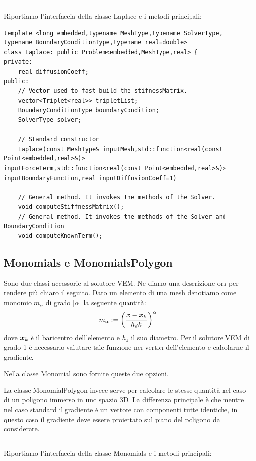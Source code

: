 \documentclass[oneside,12pt]{book}  %
\theoremstyle{plain}
\theoremstyle{definition}
\theoremstyle{remark}
\numberwithin{equation}{chapter} %
\begin{document}
\noindent\rule{14cm}{1pt}

Riportiamo l'interfaccia della classe Laplace e i metodi principali:

\begin{verbatim}
template <long embedded,typename MeshType,typename SolverType,
typename BoundaryConditionType,typename real=double>
class Laplace: public Problem<embedded,MeshType,real> {
private:
    real diffusionCoeff;	
public:
    // Vector used to fast build the stifnessMatrix.
    vector<Triplet<real>> tripletList; 
    BoundaryConditionType boundaryCondition;
    SolverType solver;

    // Standard constructor
    Laplace(const MeshType& inputMesh,std::function<real(const Point<embedded,real>&)> 
inputForceTerm,std::function<real(const Point<embedded,real>&)> 
inputBoundaryFunction,real inputDiffusionCoeff=1)

    // General method. It invokes the methods of the Solver.
    void computeStiffnessMatrix();
    // General method. It invokes the methods of the Solver and BoundaryCondition 
    void computeKnownTerm();

\end{verbatim}

\subsection{Monomials e MonomialsPolygon}
Sono due classi accessorie al solutore VEM. Ne diamo una descrizione
ora per rendere pi\`u chiaro il seguito. Dato un elemento di una mesh
denotiamo come monomio
$m_\alpha$ di grado $|\alpha|$ la seguente quantit\`a: 
$$m_\alpha:=\bigg( \frac{{\mbox{\boldmath$x$}}-{\mbox{\boldmath$x$}}_k}{h_dk} \bigg) ^\alpha$$
dove ${\mbox{\boldmath$x$}}_k$ \`e il baricentro dell'elemento e $h_k$ il suo diametro.
Per il solutore VEM di grado 1 \`e necessario valutare tale funzione
nei vertici dell'elemento e calcolarne il gradiente.

Nella classe Monomial sono fornite queste due opzioni.

La classe MonomialPolygon invece serve per calcolare le stesse
quantit\`a nel caso di un poligono immerso in uno spazio 3D.
La differenza principale \`e che mentre nel caso standard il gradiente
\`e un vettore con componenti tutte identiche, in questo caso il
gradiente deve essere proiettato sul piano del poligono da
considerare.

\noindent\rule{14cm}{1pt}

Riportiamo l'interfaccia della classe Monomials e i metodi principali:
\end{document}
